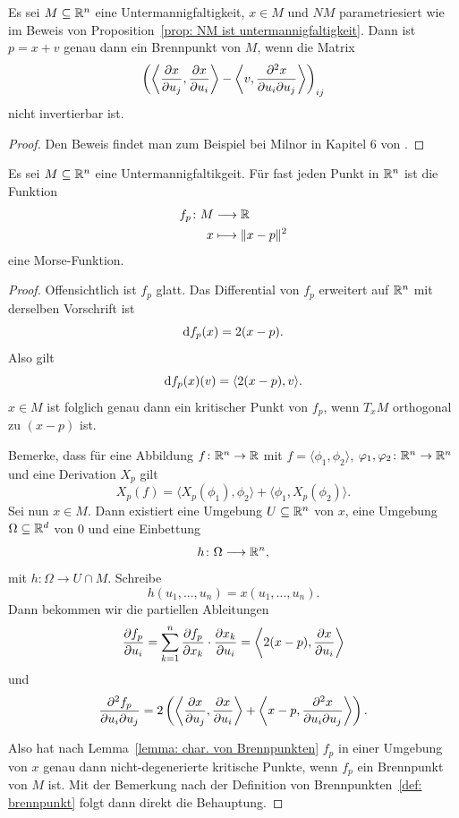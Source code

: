 \begin{lemma}
    \label{lemma: char. von Brennpunkten}
    Es sei $M \subseteq { \mathbb R }^n$ eine Untermannigfaltigkeit, $x \in M$ und $NM$ parametriesiert wie im 
    Beweis von Proposition~\ref{prop: NM ist untermannigfaltigkeit}. Dann ist $p = x + v$ genau 
    dann ein Brennpunkt von $M$, wenn die Matrix 
    \[
        \left( \left\langle \pderive[x]{u_j}, \pderive[x]{u_i} \right\rangle - 
        \left\langle v , \pdderive[x]{u_i}{u_j} \right\rangle \right)_{ij}
    \]
    nicht invertierbar ist.
\end{lemma}

\begin{proof}
    Den Beweis findet man zum Beispiel bei Milnor in Kapitel 6 von \cite{milnor}.
\end{proof}

\begin{prop}
    \label{prop: existenz morse-funktionen}
    Es sei $M \subseteq { \mathbb R }^n$ eine Untermannigfaltikgeit. Für fast jeden Punkt in ${ \mathbb R }^n$ ist
    die Funktion
    \begin{align*}
        f_p \colon M & \longrightarrow { \mathbb R } \\
        x & \longmapsto \| x - p \|^2
    \end{align*}
    eine Morse-Funktion.
\end{prop}

\begin{proof}
    Offensichtlich ist $f_p$ glatt. Das Differential von $f_p$ erweitert auf ${ \mathbb R }^n$ mit 
    derselben Vorschrift ist
    \[ { \operatorname{d} } f_p (x) = 2 (x - p). \]
    Also gilt
    \[ { \operatorname{d} } f_p (x) (v) = \langle 2 (x - p), v \rangle . \]
    $x \in M$ ist folglich genau dann ein kritischer Punkt von $f_p$, wenn $T_xM$ orthogonal 
    zu $(x - p)$ ist.

    Bemerke, dass für eine Abbildung $f \colon { \mathbb R }^n \to { \mathbb R }$ mit $f = \langle \phi_1, \phi_2 \rangle$,
    $\varphi_1, \varphi_2 \colon { \mathbb R }^n \to { \mathbb R }^n$ und eine Derivation $X_p$ gilt 
    \[ X_p (f) = \langle X_p(\phi_1), \phi_2 \rangle + \langle \phi_1, X_p(\phi_2) \rangle.  \]
    Sei nun $x \in M$. Dann existiert eine Umgebung $U \subseteq { \mathbb R }^n$ von $x$, eine Umgebung 
    $\Omega \subseteq { \mathbb R }^d$ von $0$ und eine Einbettung 
    \[ h \colon \Omega \longrightarrow { \mathbb R }^n , \]
    mit $h \colon \Omega \to U \cap M$.
    Schreibe
    \[ h(u_1, ..., u_n) = x(u_1, ..., u_n). \]
    Dann bekommen wir die partiellen Ableitungen
    \[ 
        \pderive[f_p]{u_i} = \sum_{k = 1}^n \pderive[f_p]{x_k} \cdot \pderive[x_k]{u_i} 
        = \left\langle 2(x - p), \pderive[x]{u_i} \right\rangle 
    \]
    und 
    \[ 
        \pdderive[f_p]{u_i}{u_j} = 
            2 \left( \left\langle \pderive[x]{u_j}, \pderive[x]{u_i} \right\rangle + 
            \left\langle x - p , \pdderive[x]{u_i}{u_j} \right\rangle \right) 
    . \]
    
    Also hat nach Lemma~\ref{lemma: char. von Brennpunkten} $f_p$ in einer Umgebung von $x$ genau 
    dann nicht-degenerierte kritische Punkte, wenn $f_p$ ein Brennpunkt von $M$ ist. Mit der 
    Bemerkung nach der Definition von Brennpunkten~\ref{def: brennpunkt} folgt dann direkt die 
    Behauptung.
\end{proof}

